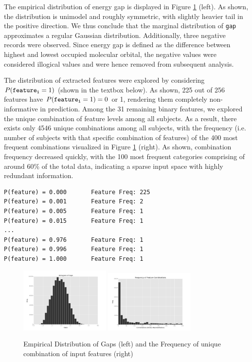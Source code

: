 \documentclass[11pt]{article}
\theoremstyle{definition}
\begin{document}
The empirical distribution of energy gap is displayed in Figure \ref{fig:hist} (left). As shown, the distribution is unimodel and roughly symmetric, with slightly heavier tail in the positive direction. We thus conclude that the marginal distribution of {\tt gap} approximates a regular Gaussian distribution. Additionally, three negative records were observed. Since energy gap is defined as the difference between highest and lowest occupied molecular orbital, the negative values were considered illogical values and were hence removed from subsequent analysis.

The distribution of extracted features were explored by considering $P({\tt feature_i} = 1)$ (shown in the textbox below). As shown, 225 out of 256 features have $P({\tt feature_i} = 1) = 0$ or 1, rendering them completely non-informative in prediction. Among the 31 remaining binary features, we  explored the unique combination of feature levels among all subjects. As a result, there exists only 4546 unique combinations among all subjects, with the frequency (i.e. number of subjects with that specific combination of features) of the 400 most frequent combinations visualized in Figure \ref{fig:hist} (right). As shown, combination frequency decreased quickly, with the 100 most frequent categories comprising of around 60\% of the total data, indicating a sparse input space with highly redundant information. 

\begin{lstlisting}
P(feature) = 0.000       Feature Freq: 225 
P(feature) = 0.001       Feature Freq: 2 
P(feature) = 0.005       Feature Freq: 1 
P(feature) = 0.015       Feature Freq: 1 
...
P(feature) = 0.976       Feature Freq: 1 
P(feature) = 0.996       Feature Freq: 1 
P(feature) = 1.000       Feature Freq: 1 
\end{lstlisting}

\begin{figure}[h!]
    \centering
    \includegraphics[width=0.4\textwidth]{"./plots/hist"}
    \includegraphics[width=0.4\textwidth]{"./plots/freq"}
    \caption{Empirical Distribution of Gaps (left) and the Frequency of unique combination of input features (right)}
    \label{fig:hist}
\end{figure}
\end{document}
